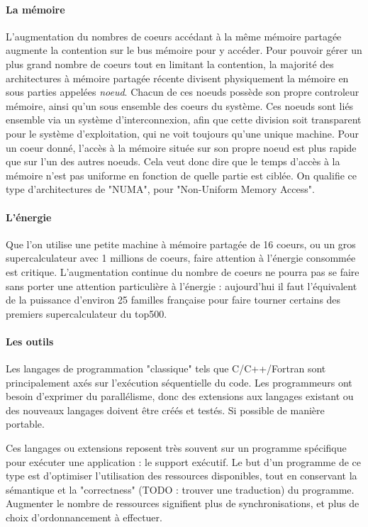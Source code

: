 \paragraph{La mémoire}
L'augmentation du nombres de coeurs accédant à la même mémoire partagée augmente la contention sur le bus mémoire pour y accéder.
Pour pouvoir gérer un plus grand nombre de coeurs tout en limitant la contention, la majorité des architectures à mémoire partagée récente divisent physiquement la mémoire en sous parties appelées \emph{noeud}.
Chacun de ces noeuds possède son propre controleur mémoire, ainsi qu'un sous ensemble des coeurs du système.
Ces noeuds sont liés ensemble via un système d'interconnexion, afin que cette division soit transparent pour le système d'exploitation, qui ne voit toujours qu'une unique machine.
Pour un coeur donné, l'accès à la mémoire située sur son propre noeud est plus rapide que sur l'un des autres noeuds. Cela veut donc dire que le temps d'accès à la mémoire n'est pas uniforme en fonction de quelle partie est ciblée.
On qualifie ce type d'architectures de "NUMA", pour "Non-Uniform Memory Access".

\paragraph{L'énergie}

Que l'on utilise une petite machine à mémoire partagée de 16 coeurs, ou un gros supercalculateur avec 1 millions de coeurs, faire attention à l'énergie consommée est critique.
L'augmentation continue du nombre de coeurs ne pourra pas se faire sans porter une attention particulière à l'énergie : aujourd'hui il faut l'équivalent de la puissance d'environ 25 familles française pour faire tourner certains des premiers supercalculateur du top500.

\paragraph{Les outils}

Les langages de programmation "classique" tels que C/C++/Fortran sont principalement axés sur l'exécution séquentielle du code.
Les programmeurs ont besoin d'exprimer du parallélisme, donc des extensions aux langages existant ou des nouveaux langages doivent être créés et testés. Si possible de manière portable.

Ces langages ou extensions reposent très souvent sur un programme spécifique pour exécuter une application : le support exécutif.
Le but d'un programme de ce type est d'optimiser l'utilisation des ressources disponibles, tout en conservant la sémantique et la "correctness" (TODO : trouver une traduction) du programme.
Augmenter le nombre de ressources signifient plus de synchronisations, et plus de choix d'ordonnancement à effectuer.

